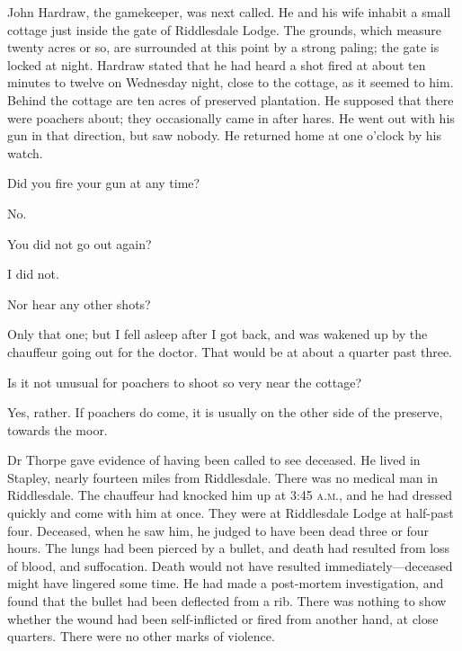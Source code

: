 John Hardraw, the gamekeeper, was next called. He and his wife inhabit a small cottage just inside the gate of Riddlesdale Lodge. The grounds, which measure twenty acres or so, are surrounded at this point by a strong paling; the gate is locked at night. Hardraw stated that he had heard a shot fired at about ten minutes to twelve on Wednesday night, close to the cottage, as it seemed to him. Behind the cottage are ten acres of preserved plantation. He supposed that there were poachers about; they occasionally came in after hares. He went out with his gun in that direction, but saw nobody. He returned home at one o'clock by his watch.

\begin{dialogue}

 Did you fire your gun at any time?

 No.

 You did not go out again?

 I did not.

 Nor hear any other shots?

 Only that one; but I fell asleep after I got back, and was wakened up by the chauffeur going out for the doctor. That would be at about a quarter past three.

 Is it not unusual for poachers to shoot so very near the cottage?

 Yes, rather. If poachers do come, it is usually on the other side of the preserve, towards the moor.
\end{dialogue}

Dr Thorpe gave evidence of having been called to see deceased. He lived in Stapley, nearly fourteen miles from Riddlesdale. There was no medical man in Riddlesdale. The chauffeur had knocked him up at 3:45 \textsc{a.m.}, and he had dressed quickly and come with him at once. They were at Riddlesdale Lodge at half-past four. Deceased, when he saw him, he judged to have been dead three or four hours. The lungs had been pierced by a bullet, and death had resulted from loss of blood, and suffocation. Death would not have resulted immediately\allowbreak---\allowbreak deceased might have lingered some time. He had made a post-mortem investigation, and found that the bullet had been deflected from a rib. There was nothing to show whether the wound had been self-inflicted or fired from another hand, at close quarters. There were no other marks of violence.

